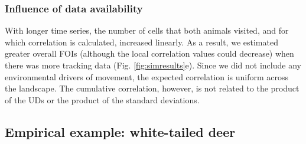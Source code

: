 \documentclass[letterpaper]{article}
\begin{document}
\subsubsection*{Influence of data availability}
With longer time series, the number of cells that both animals visited, and for which correlation is calculated, increased linearly. As a result, we estimated greater overall FOIs (although the local correlation values could decrease) when there was more tracking data (Fig. \ref{fig:simresults}e). 
Since we did not include any environmental drivers of movement, the expected correlation is uniform across the landscape. The cumulative correlation, however, is not related to the product of the UDs or the product of the standard deviations. 


\subsection*{Empirical example: white-tailed deer}
\end{document}
